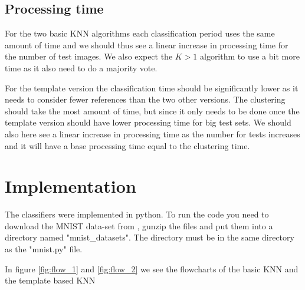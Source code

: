 \documentclass{article}
\begin{document}
\subsection{Processing time}
For the two basic KNN algorithms each classification period uses the same amount of time and we should thus see a linear increase in processing time for the number of test images. We also expect the $K > 1$ algorithm to use a bit more time as it also need to do a majority vote.

For the template version the classification time should be significantly lower as it needs to consider fewer references than the two other versions. The clustering should take the most amount of time, but since it only needs to be done once the template version should have lower processing time for big test sets. We should also here see a linear increase in processing time as the number for tests increases and it will have a base processing time equal to the clustering time.


\section{Implementation}
The classifiers were implemented in python. To run the code you need to download the MNIST data-set from \cite{MNIST}, gunzip the files and put them into a directory named "mnist\_datasets". The directory must be in the same directory as the "mnist.py" file.


In figure \ref{fig:flow_1} and \ref{fig:flow_2} we see the flowcharts of the basic KNN and the template based KNN
\end{document}
